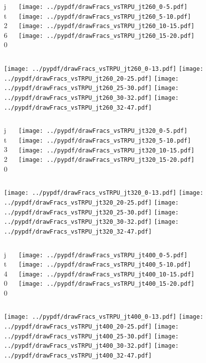 \documentclass[aspectratio=169]{beamer}
\begin{document}
\begin{figure}[p]
\flushleft
\begin{columns}[T]
\begin{column}{.2\linewidth}
\centering
jt260
\end{column}
\begin{column}{.8\linewidth}
\texttt{[image: ../pypdf/drawFracs\_vsTRPU\_jt260\_0-5.pdf]}
\texttt{[image: ../pypdf/drawFracs\_vsTRPU\_jt260\_5-10.pdf]}
\texttt{[image: ../pypdf/drawFracs\_vsTRPU\_jt260\_10-15.pdf]}
\texttt{[image: ../pypdf/drawFracs\_vsTRPU\_jt260\_15-20.pdf]}
\end{column}
\end{columns}
\texttt{[image: ../pypdf/drawFracs\_vsTRPU\_jt260\_0-13.pdf]}
\texttt{[image: ../pypdf/drawFracs\_vsTRPU\_jt260\_20-25.pdf]}
\texttt{[image: ../pypdf/drawFracs\_vsTRPU\_jt260\_25-30.pdf]}
\texttt{[image: ../pypdf/drawFracs\_vsTRPU\_jt260\_30-32.pdf]}
\texttt{[image: ../pypdf/drawFracs\_vsTRPU\_jt260\_32-47.pdf]}
\end{figure}

\begin{figure}[p]
\flushleft
\begin{columns}[T]
\begin{column}{.2\linewidth}
\centering
jt320
\end{column}
\begin{column}{.8\linewidth}
\texttt{[image: ../pypdf/drawFracs\_vsTRPU\_jt320\_0-5.pdf]}
\texttt{[image: ../pypdf/drawFracs\_vsTRPU\_jt320\_5-10.pdf]}
\texttt{[image: ../pypdf/drawFracs\_vsTRPU\_jt320\_10-15.pdf]}
\texttt{[image: ../pypdf/drawFracs\_vsTRPU\_jt320\_15-20.pdf]}
\end{column}
\end{columns}
\texttt{[image: ../pypdf/drawFracs\_vsTRPU\_jt320\_0-13.pdf]}
\texttt{[image: ../pypdf/drawFracs\_vsTRPU\_jt320\_20-25.pdf]}
\texttt{[image: ../pypdf/drawFracs\_vsTRPU\_jt320\_25-30.pdf]}
\texttt{[image: ../pypdf/drawFracs\_vsTRPU\_jt320\_30-32.pdf]}
\texttt{[image: ../pypdf/drawFracs\_vsTRPU\_jt320\_32-47.pdf]}
\end{figure}

\begin{figure}[p]
\flushleft
\begin{columns}[T]
\begin{column}{.2\linewidth}
\centering
jt400
\end{column}
\begin{column}{.8\linewidth}
\texttt{[image: ../pypdf/drawFracs\_vsTRPU\_jt400\_0-5.pdf]}
\texttt{[image: ../pypdf/drawFracs\_vsTRPU\_jt400\_5-10.pdf]}
\texttt{[image: ../pypdf/drawFracs\_vsTRPU\_jt400\_10-15.pdf]}
\texttt{[image: ../pypdf/drawFracs\_vsTRPU\_jt400\_15-20.pdf]}
\end{column}
\end{columns}
\texttt{[image: ../pypdf/drawFracs\_vsTRPU\_jt400\_0-13.pdf]}
\texttt{[image: ../pypdf/drawFracs\_vsTRPU\_jt400\_20-25.pdf]}
\texttt{[image: ../pypdf/drawFracs\_vsTRPU\_jt400\_25-30.pdf]}
\texttt{[image: ../pypdf/drawFracs\_vsTRPU\_jt400\_30-32.pdf]}
\texttt{[image: ../pypdf/drawFracs\_vsTRPU\_jt400\_32-47.pdf]}
\end{figure}
\end{document}
